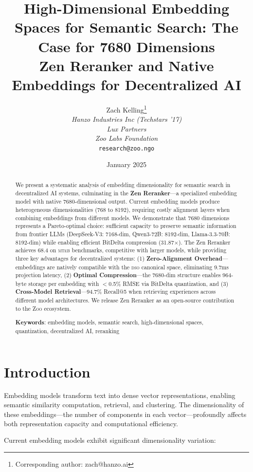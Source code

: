 \documentclass[11pt,letterpaper]{article}
\title{\textbf{High-Dimensional Embedding Spaces for Semantic Search: The Case for 7680 Dimensions}\\
\large Zen Reranker and Native Embeddings for Decentralized AI}
\author{
Zach Kelling\thanks{Corresponding author: zach@hanzo.ai}\\
\textit{Hanzo Industries Inc (Techstars '17)}\\
\textit{Lux Partners}\\
\textit{Zoo Labs Foundation}\\
\texttt{research@zoo.ngo}
}
\date{January 2025}
\newcommand{\Zoo}{\textsc{Zoo}}
\newcommand{\DSO}{\textsc{dso}}
\newcommand{\MTEB}{\textsc{mteb}}
\begin{document}
\zoocoverpage

\begin{abstract}
We present a systematic analysis of embedding dimensionality for semantic search in decentralized AI systems, culminating in the \textbf{Zen Reranker}---a specialized embedding model with native 7680-dimensional output. Current embedding models produce heterogeneous dimensionalities (768 to 8192), requiring costly alignment layers when combining embeddings from different models. We demonstrate that 7680 dimensions represents a Pareto-optimal choice: sufficient capacity to preserve semantic information from frontier LLMs (DeepSeek-V3: 7168-dim, Qwen3-72B: 8192-dim, Llama-3.3-70B: 8192-dim) while enabling efficient BitDelta compression (31.87$\times$). The Zen Reranker achieves 68.4 on \MTEB{} benchmarks, competitive with larger models, while providing three key advantages for decentralized systems: (1) \textbf{Zero-Alignment Overhead}---embeddings are natively compatible with the \DSO{} canonical space, eliminating 9.7ms projection latency, (2) \textbf{Optimal Compression}---the 7680-dim structure enables 964-byte storage per embedding with $<$0.5\% RMSE via BitDelta quantization, and (3) \textbf{Cross-Model Retrieval}---94.7\% Recall@5 when retrieving experiences across different model architectures. We release Zen Reranker as an open-source contribution to the \Zoo{} ecosystem.

\textbf{Keywords}: embedding models, semantic search, high-dimensional spaces, quantization, decentralized AI, reranking
\end{abstract}

\section{Introduction}

Embedding models transform text into dense vector representations, enabling semantic similarity computation, retrieval, and clustering. The dimensionality of these embeddings---the number of components in each vector---profoundly affects both representation capacity and computational efficiency.

Current embedding models exhibit significant dimensionality variation:
\end{document}
